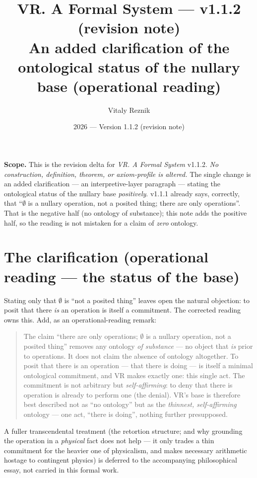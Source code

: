 \documentclass[11pt]{article}
\title{\textbf{VR. A Formal System --- v1.1.2 (revision note)}\\[2pt]
\large An added clarification of the ontological status of the nullary base (operational reading)}
\author{Vitaly Reznik}
\date{2026 --- Version 1.1.2 (revision note)}
\begin{document}
\maketitle

\noindent\textbf{Scope.} This is the revision delta for \emph{VR. A Formal System} v1.1.2. \emph{No
construction, definition, theorem, or axiom-profile is altered.} The single change is an added
clarification --- an interpretive-layer paragraph --- stating the ontological status of the nullary
base \emph{positively}. v1.1.1 already says, correctly, that ``$\emptyset$ is a nullary operation, not a
posited thing; there are only operations''. That is the negative half (no ontology of substance); this
note adds the positive half, so the reading is not mistaken for a claim of \emph{zero} ontology.

\section*{The clarification (operational reading --- the status of the base)}

Stating only that $\emptyset$ is ``not a posited thing'' leaves open the natural objection: to posit that
there \emph{is} an operation is itself a commitment. The corrected reading owns this. Add, as an
operational-reading remark:

\begin{quote}
The claim ``there are only operations; $\emptyset$ is a nullary operation, not a posited thing'' removes
any ontology \emph{of substance} --- no object that \emph{is} prior to operations. It does not claim the
absence of ontology altogether. To posit that there is an operation --- that there is doing --- is itself
a minimal ontological commitment, and VR makes exactly one: this single act. The commitment is not
arbitrary but \emph{self-affirming}: to deny that there is operation is already to perform one (the
denial). VR's base is therefore best described not as ``no ontology'' but as the \emph{thinnest,
self-affirming} ontology --- one act, ``there is doing'', nothing further presupposed.
\end{quote}

\noindent A fuller transcendental treatment (the retortion structure; and why grounding the operation in
a \emph{physical} fact does not help --- it only trades a thin commitment for the heavier one of
physicalism, and makes necessary arithmetic hostage to contingent physics) is deferred to the
accompanying philosophical essay, not carried in this formal work.
\end{document}
